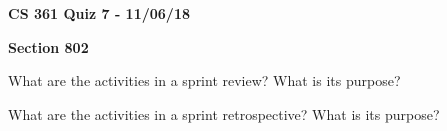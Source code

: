 \documentclass{exam}
\begin{document}
\begin{center}
	\textbf{CS 361 Quiz 7 - 11/06/18}
	
	\textbf{Section 802}
	
	\vspace{1em}
	
\end{center}

\begin{questions}
	
\question[5] What are the activities in a sprint review? What is its purpose?
\vfill

\question[5] What are the activities in a sprint retrospective? What is its purpose?
\vfill
\end{questions}
\end{document}
